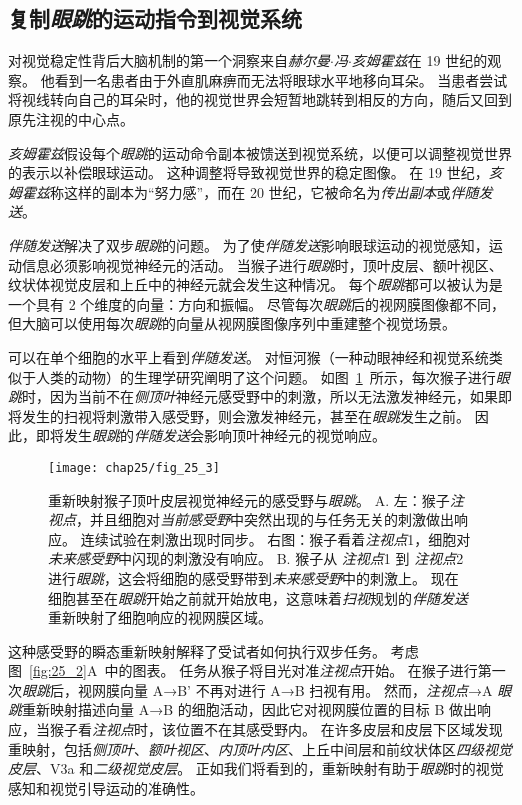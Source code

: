 \subsection{复制\textit{眼跳}的运动指令到视觉系统}

对视觉稳定性背后大脑机制的第一个洞察来自\textit{赫尔曼$\cdot$冯$\cdot$亥姆霍兹}在 19 世纪的观察。
他看到一名患者由于外直肌麻痹而无法将眼球水平地移向耳朵。
当患者尝试将视线转向自己的耳朵时，他的视觉世界会短暂地跳转到相反的方向，随后又回到原先注视的中心点。


\textit{亥姆霍兹}假设每个\textit{眼跳}的运动命令副本被馈送到视觉系统，以便可以调整视觉世界的表示以补偿眼球运动。
这种调整将导致视觉世界的稳定图像。
在 19 世纪，\textit{亥姆霍兹}称这样的副本为“努力感”，而在 20 世纪，它被命名为\textit{传出副本}或\textit{伴随发送}。


\textit{伴随发送}解决了双步\textit{眼跳}的问题。
为了使\textit{伴随发送}影响眼球运动的视觉感知，运动信息必须影响视觉神经元的活动。
当猴子进行\textit{眼跳}时，顶叶皮层、额叶视区、纹状体视觉皮层和上丘中的神经元就会发生这种情况。
每个\textit{眼跳}都可以被认为是一个具有 2 个维度的向量：方向和振幅。
尽管每次\textit{眼跳}后的视网膜图像都不同，但大脑可以使用每次\textit{眼跳}的向量从视网膜图像序列中重建整个视觉场景。


可以在单个细胞的水平上看到\textit{伴随发送}。
对恒河猴（一种动眼神经和视觉系统类似于人类的动物）的生理学研究阐明了这个问题。
如图~\ref{fig:25_3}~所示，每次猴子进行\textit{眼跳}时，因为当前不在\textit{侧顶叶}神经元感受野中的刺激，所以无法激发神经元，如果即将发生的扫视将刺激带入感受野，则会激发神经元，甚至在\textit{眼跳}发生之前。
因此，即将发生\textit{眼跳}的\textit{伴随发送}会影响顶叶神经元的视觉响应。


\begin{figure}[htbp]
	\centering
	\texttt{[image: chap25/fig\_25\_3]}
	\caption{重新映射猴子顶叶皮层视觉神经元的感受野与\textit{眼跳}\cite{duhamel1992updating}。
		A. 左：猴子\textit{注视点}，并且细胞对\textit{当前感受野}中突然出现的与任务无关的刺激做出响应。
		连续试验在刺激出现时同步。
		右图：猴子看着\textit{注视点}1，细胞对\textit{未来感受野}中闪现的刺激没有响应。
		B. 猴子从 \textit{注视点}1 到 \textit{注视点}2 进行\textit{眼跳}，这会将细胞的感受野带到\textit{未来感受野}中的刺激上。
		现在细胞甚至在\textit{眼跳}开始之前就开始放电，这意味着\textit{扫视}规划的\textit{伴随发送}重新映射了细胞响应的视网膜区域。}
	\label{fig:25_3}
\end{figure}


这种感受野的瞬态重新映射解释了受试者如何执行双步任务。
考虑图~\ref{fig:25_2}A~中的图表。
任务从猴子将目光对准\textit{注视点}开始。
在猴子进行第一次\textit{眼跳}后，视网膜向量 A→B' 不再对进行 A→B 扫视有用。
然而，\textit{注视点}→A \textit{眼跳}重新映射描述向量 A→B 的细胞活动，因此它对视网膜位置的目标 B 做出响应，当猴子看\textit{注视点}时，该位置不在其感受野内。
在许多皮层和皮层下区域发现重映射，包括\textit{侧顶叶}、\textit{额叶视区}、\textit{内顶叶内区}、上丘中间层和前纹状体区\textit{四级视觉皮层}、V3a 和\textit{二级视觉皮层}。
正如我们将看到的，重新映射有助于\textit{眼跳}时的视觉感知和视觉引导运动的准确性。


